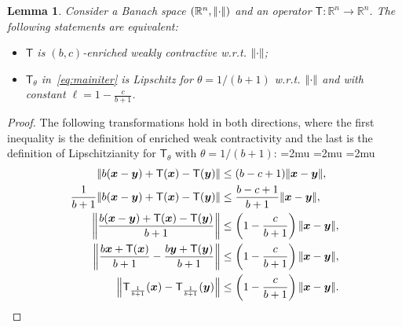 \documentclass[journal,twoside,web]{ieeecolor}
\newcommand{\norm}[1]{{\left\vert\kern-0.25ex\left\vert #1\right\vert\kern-0.25ex\right\vert}}
\newcommand{\rea }{\mathbb{R}}
\newcommand{\xb}{\boldsymbol{x}}
\newcommand{\yb}{\boldsymbol{y}}
\newcommand{\Ts}{\mathsf{T}}
\newtheorem{lem}{Lemma}
\begin{document}
\begin{lem}\label{lem:lipcond}
Consider a Banach space $(\rea^n,\norm{\cdot})$ and an operator $\Ts:\rea^n\rightarrow \rea^n$. The following statements are equivalent:
%
\begin{itemize}
 \item $\Ts$ is $(b,c)$-enriched weakly contractive w.r.t. $\norm{\cdot}$;
 \item $\Ts_\theta$ in~\eqref{eq:mainiter} is Lipschitz for $\theta=1/(b+1)$ w.r.t. $\norm{\cdot}$ and with constant $\ell=1-\frac{c}{b+1}$.
\end{itemize}
\end{lem}
%
\begin{proof}
The following transformations hold in both directions, where the first inequality is the definition of enriched weak contractivity and the last is the definition of Lipschitzianity for $\Ts_{\theta}$ with $\theta = 1/(b+1)$:
%
\begingroup
\medmuskip=2mu
\thinmuskip=2mu
\thickmuskip=2mu
\allowdisplaybreaks
\begin{align*}
\norm{b(\xb-\yb)+\Ts(\xb)-\Ts(\yb)} & \leq (b-c+1)\norm{\xb-\yb},\\
\frac{1}{b+1}\norm{b(\xb-\yb)+\Ts(\xb)-\Ts(\yb)} & \leq \frac{b-c+1}{b+1}\norm{\xb-\yb},\\
\norm{\frac{b(\xb-\yb)+\Ts(\xb)-\Ts(\yb)}{b+1}} & \leq \left(1-\frac{c}{b+1}\right)\norm{\xb-\yb},\\
\norm{\frac{b\xb+\Ts(\xb)}{b+1} - \frac{b\yb+\Ts(\yb)}{b+1}} & \leq \left(1-\frac{c}{b+1}\right)\norm{\xb-\yb},\\
\norm{\Ts_{\frac{1}{b+1}}(\xb) - \Ts_{\frac{1}{b+1}}(\yb)} & \leq \left(1-\frac{c}{b+1}\right)\norm{\xb-\yb}.
\end{align*}
\endgroup
\end{proof}

%



%
\end{document}

